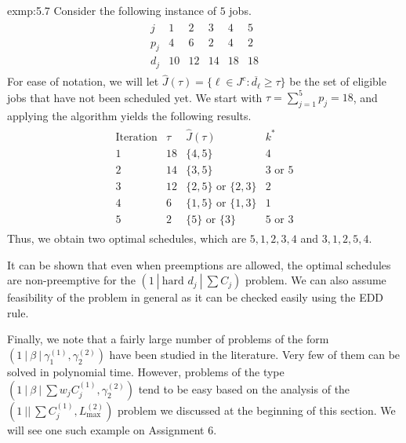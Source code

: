 \begin{exmp}{exmp:5.7}
    Consider the following instance of $5$ jobs. 
    \begin{align*}
        \begin{array}{c|ccccc}
            j & 1 & 2 & 3 & 4 & 5 \\ \hline 
            p_j & 4 & 6 & 2 & 4 & 2 \\ 
            d_j & 10 & 12 & 14 & 18 & 18
        \end{array}
    \end{align*}
    For ease of notation, we will let $\hat J(\tau) = \{\ell \in J^c : 
    \overline{d_\ell} \geq \tau\}$ be the set of eligible jobs that have 
    not been scheduled yet. We start with $\tau = \sum_{j=1}^5 p_j = 18$, 
    and applying the algorithm yields the following results. 
    \begin{align*}
        \begin{array}{c|c|c|c} 
            \text{Iteration} & \tau & \hat J(\tau) & k^* \\ \hline 
            1 & 18 & \{4, 5\} & 4 \\ 
            2 & 14 & \{3, 5\} & 3 \text{ or } 5 \\ 
            3 & 12 & \{2, 5\} \text{ or } \{2, 3\} & 2 \\ 
            4 & 6 & \{1, 5\} \text{ or } \{1, 3\} & 1 \\ 
            5 & 2 & \{5\} \text{ or } \{3\} & 5 \text{ or } 3            
        \end{array}
    \end{align*}
    Thus, we obtain two optimal schedules, which are $5, 1, 2, 3, 4$ and 
    $3, 1, 2, 5, 4$. 
\end{exmp}

It can be shown that even when preemptions are allowed, the optimal schedules 
are non-preemptive for the $(1~|~\text{hard } d_j~|~\sum C_j)$ problem. We can 
also assume feasibility of the problem in general as it can be checked easily 
using the EDD rule. 

Finally, we note that a fairly large number of problems of the form 
$(1~|~\beta~|~\gamma_1^{(1)}, \gamma_2^{(2)})$ have been studied in the 
literature. Very few of them can be solved in polynomial time. However, 
problems of the type $(1~|~\beta~|~\sum w_j C_j^{(1)}, \gamma_2^{(2)})$ 
tend to be easy based on the analysis of the $(1~||~\sum C_j^{(1)}, 
L_{\max}^{(2)})$ problem we discussed at the beginning of this section. 
We will see one such example on Assignment 6.

